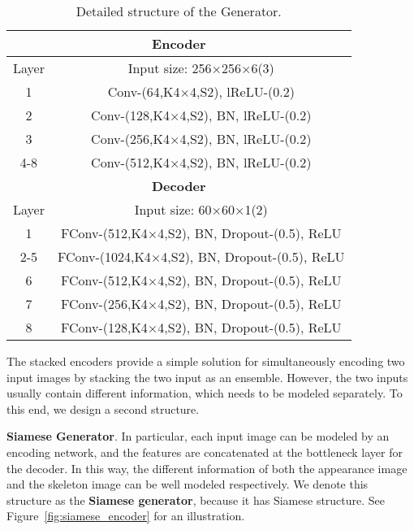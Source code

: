 \documentclass[journal]{IEEEtran}
\begin{document}
\begin{table}[]
\centering
\caption{Detailed structure of the Generator.}
\label{generator}
\begin{tabular}{|c|c|}
\hline
\multicolumn{2}{|c|}{\textbf{Encoder}}                \\ \hline
Layer & Input size: 256$\times$256$\times$6(3)                       \\ \hline
1     & Conv-(64,K4$\times$4,S2), lReLU-(0.2)                   \\
2     & Conv-(128,K4$\times$4,S2), BN, lReLU-(0.2)                  \\
3     & Conv-(256,K4$\times$4,S2), BN, lReLU-(0.2)                  \\
4-8   & Conv-(512,K4$\times$4,S2), BN, lReLU-(0.2)                  \\ \hline
\multicolumn{2}{|c|}{\textbf{Decoder}}                \\ \hline
Layer & Input size: 60$\times$60$\times$1(2)                            \\ \hline
1     & FConv-(512,K4$\times$4,S2), BN, Dropout-(0.5), ReLU  \\
2-5   & FConv-(1024,K4$\times$4,S2), BN, Dropout-(0.5), ReLU \\
6     & FConv-(512,K4$\times$4,S2), BN, Dropout-(0.5), ReLU  \\
7     & FConv-(256,K4$\times$4,S2), BN, Dropout-(0.5), ReLU  \\
8     & FConv-(128,K4$\times$4,S2), BN, Dropout-(0.5), ReLU  \\ \hline
\end{tabular}
\end{table}

The stacked encoders provide a simple solution for simultaneously encoding two input images by stacking the two input as an ensemble. However, the two inputs usually contain different information, which needs to be modeled separately. To this end, we design a second structure.

\textbf{Siamese Generator}. In particular, each input image can be modeled by an encoding network, and the features are concatenated at the bottleneck layer for the decoder. In this way, the different information of both the appearance image and the skeleton image can be well modeled respectively.
We denote this structure as the \textbf{Siamese generator}, because it has Siamese structure. See Figure~\ref{fig:siamese_encoder} for an illustration.
\end{document}
